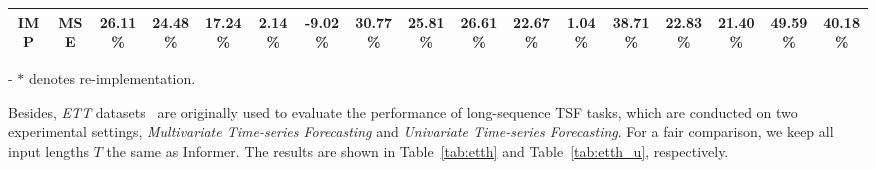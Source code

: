 \documentclass{article}
\begin{document}
\begin{table*}[htbp]
\begin{threeparttable}
{\begin{tabular}{c|c|c|c|c|c|c|c|c|c|c|c|c|c|c|c|c}
\textbf{IMP} & MSE           & {\color[RGB]{230, 57, 70}  26.11\%}                                          & {\color[RGB]{230, 57, 70}  24.48\%}                                             & {\color[RGB]{230, 57, 70}  17.24\%}                                           & {\color[RGB]{230, 57, 70}  2.14\%}                                             & {\color[RGB]{230, 57, 70}  -9.02\%}                                             & {\color[RGB]{230, 57, 70}  30.77\%}                                             & {\color[RGB]{230, 57, 70}  25.81\%}                                             & {\color[RGB]{230, 57, 70}  26.61\%}                                            & {\color[RGB]{230, 57, 70}  22.67\%}                                          & {\color[RGB]{230, 57, 70}  1.04\%}                                            & {\color[RGB]{230, 57, 70}  38.71\%}                                            & {\color[RGB]{230, 57, 70}  22.83\%}                                           & {\color[RGB]{230, 57, 70}  21.40\%}                                           & {\color[RGB]{230, 57, 70}  49.59\%}                                           & {\color[RGB]{230, 57, 70}  40.18\%}\\ \hline
\end{tabular}}
\begin{tablenotes} \tiny
		\item - $*$ denotes re-implementation. \hspace{10pt}
 \end{tablenotes} 

\end{threeparttable} \label{tab:etth}
\end{table*}

Besides, \textit{ETT} datasets~\citep{Zhou2020InformerBE} are originally used to evaluate the performance of long-sequence TSF tasks, which are conducted on two experimental settings, \emph{Multivariate Time-series Forecasting} and \emph{Univariate Time-series Forecasting}. For a fair comparison, we keep all input lengths $T$ the same as Informer. The results are shown in Table~\ref{tab:etth} and Table~\ref{tab:etth_u}, respectively. 
\end{document}
